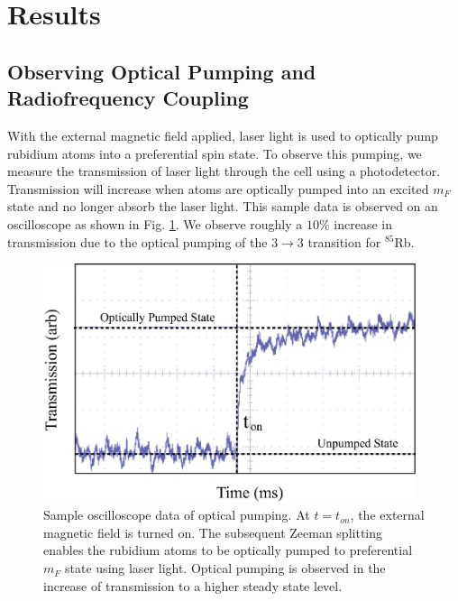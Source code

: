 

\section{Results}\label{results}

\subsection{Observing Optical Pumping and Radiofrequency Coupling}\label{ObservingOpticalPumpingandrfCoupling}

With the external magnetic field applied, laser light is used to optically pump rubidium atoms into a preferential spin state.  To observe this pumping, we measure the transmission of laser light through the cell using a photodetector.  Transmission will increase when atoms are optically pumped into an excited $m_F$ state and no longer absorb the laser light. This sample data is observed on an oscilloscope as shown in Fig. \ref{fig:raw_data}.  We observe roughly a $10\%$ increase in transmission due to the optical pumping of the $3\rightarrow3$ transition for $^{85}$Rb.
\begin{figure}[htbp]
\begin{center}
\includegraphics[height=70mm]{./figures/raw_data.eps}
\caption{\small{Sample oscilloscope data of optical pumping. At $t=t_{on}$, the external magnetic field is turned on. The subsequent Zeeman splitting enables the rubidium atoms to be optically pumped to preferential $m_F$ state using laser light.  Optical pumping is observed in the increase of transmission to a higher steady state level.}}
\label{fig:raw_data}
\end{center}
\end{figure}

